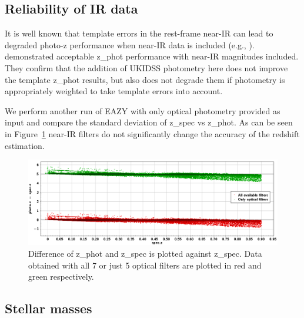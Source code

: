 \subsection{Reliability of IR data}
It is well known that template errors in the rest-frame
near-IR can lead to degraded photo-z performance when
near-IR data is included (e.g., \citep{Brammer2008}).
\citep{2012AJ....144..188B} demonstrated acceptable z\_phot
performance with near-IR magnitudes included. They confirm that
the addition of UKIDSS photometry here does not improve the template z\_phot results, but also does not degrade them if photometry is appropriately weighted to
take template errors into account. 

We perform another run of EAZY with only optical photometry provided as input and compare the standard deviation of z\_spec vs z\_phot. As can be seen in Figure~\ref{fig:photo_z_nowise} near-IR filters do not significantly change the accuracy of the redshift estimation.

\begin{figure}[!ht]
\includegraphics[width=5.7in]{Figures/photo_z_-_spec_z_nowise_wise.png}
\caption{Difference of z\_phot and z\_spec is plotted against z\_spec. Data obtained with all 7 or just 5 optical filters are plotted in red and green respectively.}
\label{fig:photo_z_nowise}
\end{figure}

\subsection{Stellar masses}

